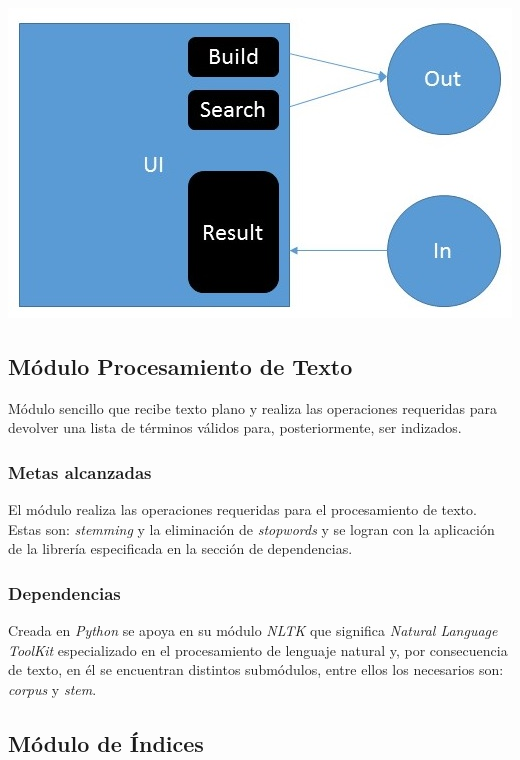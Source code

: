 \documentclass{llncs}
\begin{document}
{\includegraphics[]{ui}}
{\hfil{}}

\subsection{M\'odulo Procesamiento de Texto}

M\'odulo sencillo que recibe texto plano y realiza las operaciones requeridas para devolver una lista de t\'erminos v\'alidos para,
posteriormente, ser indizados.

\subsubsection{Metas alcanzadas}
El m\'odulo realiza las operaciones requeridas para el procesamiento de texto. Estas son: {\textit{stemming}} y la eliminaci\'on 
de {\textit{stopwords}} y se logran con la aplicaci\'on de la librer\'ia especificada en la secci\'on de dependencias.

\subsubsection{Dependencias}
Creada en {\textit{Python}} se apoya en su m\'odulo {\textit{NLTK}} que significa {\textit{Natural Language ToolKit}} especializado
en el procesamiento de lenguaje natural y, por consecuencia de texto, en \'el se encuentran distintos subm\'odulos, entre ellos los
necesarios son: {\textit{corpus}} y {\textit{stem}}.

\subsection{M\'odulo de \'Indices}
\end{document}
